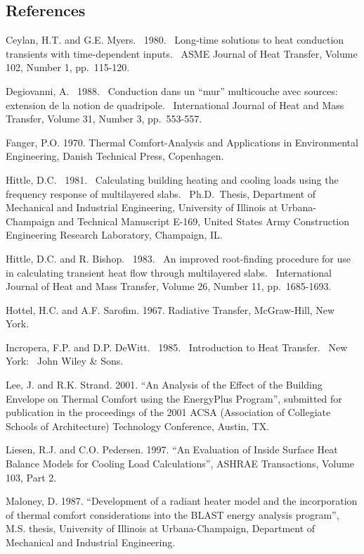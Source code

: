 {\subsection{References}\label{references-039}

Ceylan, H.T. and G.E. Myers.~ 1980.~ Long-time solutions to heat conduction transients with time-dependent inputs.~ ASME Journal of Heat Transfer, Volume 102, Number 1, pp.~115-120.

Degiovanni, A.~ 1988.~ Conduction dans un ``mur'' multicouche avec sources:~ extension de la notion de quadripole.~ International Journal of Heat and Mass Transfer, Volume 31, Number 3, pp.~553-557.

Fanger, P.O. 1970. Thermal Comfort-Analysis and Applications in Environmental Engineering, Danish Technical Press, Copenhagen.

Hittle, D.C.~ 1981.~ Calculating building heating and cooling loads using the frequency response of multilayered slabs.~ Ph.D.~Thesis, Department of Mechanical and Industrial Engineering, University of Illinois at Urbana-Champaign and Technical Manuscript E-169, United States Army Construction Engineering Research Laboratory, Champaign, IL.

Hittle, D.C. and R. Bishop.~ 1983.~ An improved root-finding procedure for use in calculating transient heat flow through multilayered slabs.~ International Journal of Heat and Mass Transfer, Volume 26, Number 11, pp.~1685-1693.

Hottel, H.C. and A.F. Sarofim. 1967. Radiative Transfer, McGraw-Hill, New York.

Incropera, F.P. and D.P. DeWitt.~ 1985.~ Introduction to Heat Transfer.~ New York:~ John Wiley \& Sons.

Lee, J. and R.K. Strand. 2001. ``An Analysis of the Effect of the Building Envelope on Thermal Comfort using the EnergyPlus Program'', submitted for publication in the proceedings of the 2001 ACSA (Association of Collegiate Schools of Architecture) Technology Conference, Austin, TX.

Liesen, R.J. and C.O. Pedersen. 1997. ``An Evaluation of Inside Surface Heat Balance Models for Cooling Load Calculations'', ASHRAE Transactions, Volume 103, Part 2.

Maloney, D. 1987. ``Development of a radiant heater model and the incorporation of thermal comfort considerations into the BLAST energy analysis program'', M.S. thesis, University of Illinois at Urbana-Champaign, Department of Mechanical and Industrial Engineering.

}
